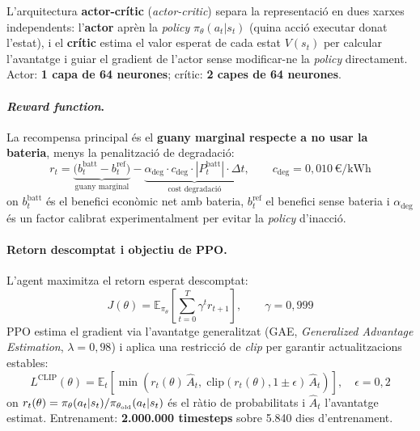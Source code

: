 \documentclass[a4paper,11pt]{article}
\begin{document}
L'arquitectura \textbf{actor-crític} (\textit{actor-critic}) separa la
representació en dues xarxes independents: l'\textbf{actor} aprèn la
\textit{policy} $\pi_\theta(a_t|s_t)$ (quina acció executar donat l'estat),
i el \textbf{crític} estima el valor esperat de cada estat $V(s_t)$ per
calcular l'avantatge i guiar el gradient de l'actor sense modificar-ne
la \textit{policy} directament. Actor: \textbf{1 capa de 64 neurones};
crític: \textbf{2 capes de 64 neurones}.

\paragraph{\textit{Reward function}.}
La recompensa principal és el \textbf{guany marginal respecte a no usar
la bateria}, menys la penalització de degradació:
\begin{equation}
  r_t = \underbrace{\bigl(b_t^{\mathrm{batt}} - b_t^{\mathrm{ref}}\bigr)}_{\text{guany marginal}}
       - \underbrace{\alpha_{\mathrm{deg}}\cdot c_{\mathrm{deg}}\cdot
         |P_t^{\mathrm{batt}}|\cdot\Delta t}_{\text{cost degradació}},
  \qquad c_{\mathrm{deg}}=0{,}010\,\text{€/kWh}
  \label{eq:reward}
\end{equation}
on $b_t^{\mathrm{batt}}$ és el benefici econòmic net amb bateria,
$b_t^{\mathrm{ref}}$ el benefici sense bateria i $\alpha_{\mathrm{deg}}$
és un factor calibrat experimentalment per evitar la \textit{policy} d'inacció.

\paragraph{Retorn descomptat i objectiu de PPO.}
L'agent maximitza el retorn esperat descomptat:
\begin{equation}
  J(\theta) = \mathbb{E}_{\pi_\theta}\!\left[\sum_{t=0}^{T}\gamma^t r_{t+1}\right],
  \qquad \gamma = 0{,}999
\end{equation}
PPO estima el gradient via l'avantatge generalitzat
(GAE, \textit{Generalized Advantage Estimation}, $\lambda=0{,}98$) i aplica
una restricció de \textit{clip} per garantir actualitzacions estables:
\begin{equation}
  L^{\mathrm{CLIP}}(\theta)=\mathbb{E}_t\!\left[
    \min\!\left(r_t(\theta)\,\hat{A}_t,\;
    \mathrm{clip}(r_t(\theta),1\pm\epsilon)\,\hat{A}_t\right)\right],
  \quad\epsilon=0{,}2
\end{equation}
on $r_t(\theta)=\pi_\theta(a_t|s_t)/\pi_{\theta_{\rm old}}(a_t|s_t)$
és el ràtio de probabilitats i $\hat{A}_t$ l'avantatge estimat.
Entrenament: \textbf{2.000.000 timesteps} sobre 5.840 dies d'entrenament.
\end{document}
